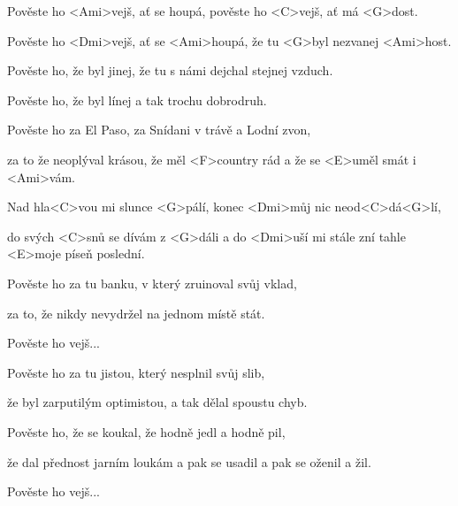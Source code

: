 
\zs

Pověste ho <Ami>vejš, ať se houpá,
pověste ho <C>vejš, ať má <G>dost.

Pověste ho <Dmi>vejš, ať se <Ami>houpá,
že tu <G>byl nezvanej <Ami>host.

\ks
\zs

Pověste ho, že byl jinej,
že tu s námi dejchal stejnej vzduch.

Pověste ho, že byl línej
a tak trochu dobrodruh.

\ks
\zs

Pověste ho za El Paso,
za Snídani v trávě a Lodní zvon,

za to že neoplýval krásou,
že měl <F>country rád a že se <E>uměl smát i <Ami>vám.

\ks
\zr

Nad hla<C>vou mi slunce <G>pálí,
konec <Dmi>můj nic neod<C>dá<G>lí,

do svých <C>snů se dívám z <G>dáli
a do <Dmi>uší mi stále zní tahle <E>moje píseň poslední.

\kr
\zs

Pověste ho za tu banku,
v který zruinoval svůj vklad,

za to, že nikdy nevydržel
na jednom místě stát.

\ks
\zr \kr
\zs

Pověste ho vejš...

\ks
\zs

Pověste ho za tu jistou,
který nesplnil svůj slib,

že byl zarputilým optimistou,
a tak dělal spoustu chyb.

\ks
\zs

Pověste ho, že se koukal,
že hodně jedl a hodně pil,

že dal přednost jarním loukám
a pak se usadil a pak se oženil
a žil.

\ks
\zs

Pověste ho vejš...

\ks
\kp
